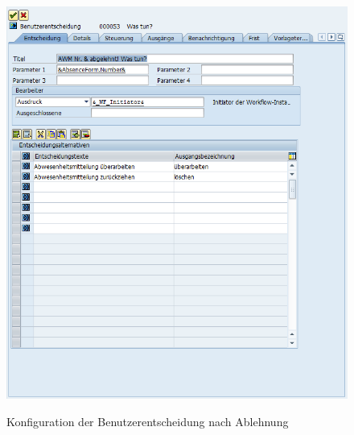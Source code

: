 \begin{figure}[H]
	\begin{center}
	\includegraphics[width=1.0\textwidth]{grafiken/wf-builder_bsp2_act_was-tun.png}
	\caption{Konfiguration der Benutzerentscheidung nach Ablehnung}
	\vspace{-10pt}
	\label{abb:workflow-bsp2-act_was-tun}
	\end{center}
\end{figure}

